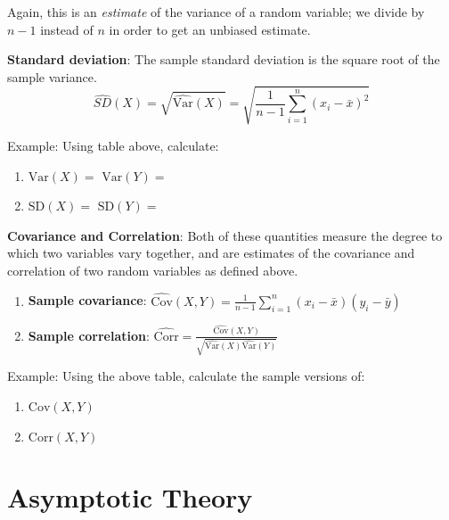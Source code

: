 \documentclass[]{book}
\providecommand{\tightlist}{%
  \setlength{\itemsep}{0pt}\setlength{\parskip}{0pt}}
\newcommand{\SD}{\mathrm{SD}}
\theoremstyle{definition}
\theoremstyle{definition}
\theoremstyle{definition}
\theoremstyle{remark}
\begin{document}
Again, this is an \emph{estimate} of the variance of a random variable; we divide by \(n - 1\) instead of \(n\) in order to get an unbiased estimate.

\textbf{Standard deviation}: The sample standard deviation is the square root of the sample variance.
\[ \hat{SD}(X) = \sqrt{\hat{\text{Var}}(X)} = \sqrt{\frac{1}{n-1}\sum_{i = 1}^n (x_i - \bar{x})^2}\]

\begin{framed}
Example: Using table above, calculate: 
\begin{enumerate}
\item $\text{Var}(X) = $ \hspace{1.5cm} $\text{Var}(Y) =$
\item $\SD(X) = $ \hspace{1.65cm} $\SD(Y) =$
\end{enumerate}
\end{framed}

\textbf{Covariance and Correlation}: Both of these quantities measure the degree to which two variables vary together, and are estimates of the covariance and correlation of two random variables as defined above.

\begin{enumerate}
\def\labelenumi{\arabic{enumi}.}
\tightlist
\item
  \textbf{Sample covariance}: \(\hat{\text{Cov}}(X,Y) = \frac{1}{n-1}\sum_{i = 1}^n(x_i - \bar{x})(y_i - \bar{y})\)
\item
  \textbf{Sample correlation}: \(\hat{\text{Corr}} = \frac{\hat{\text{Cov}}(X,Y)}{\sqrt{\hat{\text{Var}}(X)\hat{\text{Var}}(Y)}}\)
\end{enumerate}

\protect\hypertarget{exm:unnamed-chunk-94}{}{\label{exm:unnamed-chunk-94} }Example: Using the above table, calculate the sample versions of:

\begin{enumerate}
\def\labelenumi{\arabic{enumi}.}
\tightlist
\item
  \(\text{Cov}(X,Y)\)
\item
  \(\text{Corr}(X, Y)\)
\end{enumerate}

\hypertarget{asymptotic-theory}{%
\section{Asymptotic Theory}\label{asymptotic-theory}}
\end{document}
